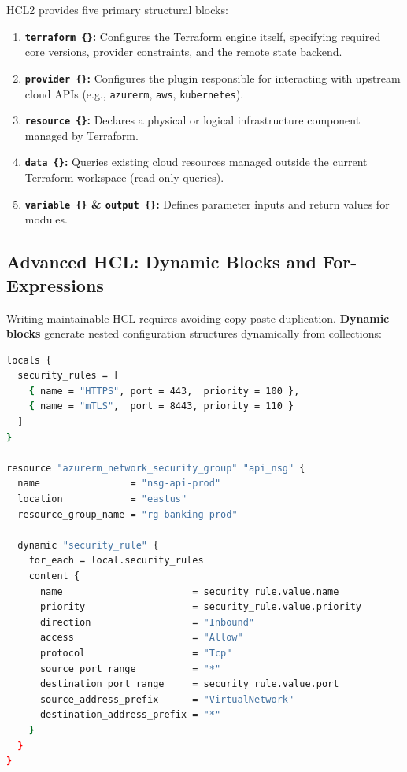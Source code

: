 HCL2 provides five primary structural blocks:
\begin{enumerate}[leftmargin=15pt]
  \item \textbf{\texttt{terraform \{\}}:} Configures the Terraform engine itself, specifying required core versions, provider constraints, and the remote state backend.
  \item \textbf{\texttt{provider \{\}}:} Configures the plugin responsible for interacting with upstream cloud APIs (e.g., \texttt{azurerm}, \texttt{aws}, \texttt{kubernetes}).
  \item \textbf{\texttt{resource \{\}}:} Declares a physical or logical infrastructure component managed by Terraform.
  \item \textbf{\texttt{data \{\}}:} Queries existing cloud resources managed outside the current Terraform workspace (read-only queries).
  \item \textbf{\texttt{variable \{\}} \& \texttt{output \{\}}:} Defines parameter inputs and return values for modules.
\end{enumerate}

\subsection{Advanced HCL: Dynamic Blocks and For-Expressions}
Writing maintainable HCL requires avoiding copy-paste duplication. \textbf{Dynamic blocks} generate nested configuration structures dynamically from collections:

\begin{lstlisting}[language=bash, caption={Generating Dynamic NSG Security Rules via HCL2}]
locals {
  security_rules = [
    { name = "HTTPS", port = 443,  priority = 100 },
    { name = "mTLS",  port = 8443, priority = 110 }
  ]
}

resource "azurerm_network_security_group" "api_nsg" {
  name                = "nsg-api-prod"
  location            = "eastus"
  resource_group_name = "rg-banking-prod"

  dynamic "security_rule" {
    for_each = local.security_rules
    content {
      name                       = security_rule.value.name
      priority                   = security_rule.value.priority
      direction                  = "Inbound"
      access                     = "Allow"
      protocol                   = "Tcp"
      source_port_range          = "*"
      destination_port_range     = security_rule.value.port
      source_address_prefix      = "VirtualNetwork"
      destination_address_prefix = "*"
    }
  }
}
\end{lstlisting}


